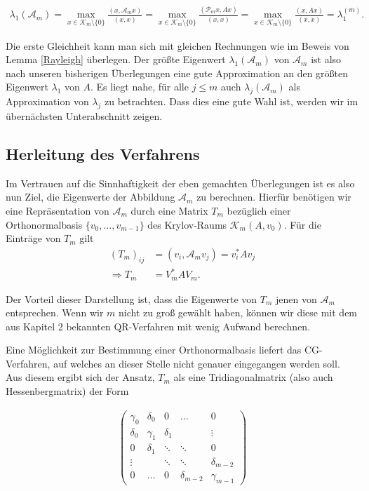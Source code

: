 \documentclass{article}
\begin{document}
\begin{align*}
	\lambda_1(\mathcal{A}_m) = \max_{x \in \mathcal{K}_m \setminus \{0\}} \frac{(x, \mathcal{A}_m x)}{(x,x)} = \max_{x \in \mathcal{K}_m \setminus \{0\}} \frac{(\mathcal{P}_m x, A x)}{(x,x)} = \max_{x \in \mathcal{K}_m \setminus \{0\}} \frac{(x, A x)}{(x,x)} = \lambda_1^{(m)}.
\end{align*}

Die erste Gleichheit kann man sich mit gleichen Rechnungen wie im Beweis von Lemma \ref{Rayleigh} überlegen. Der größte Eigenwert $\lambda_1(\mathcal{A}_m)$ von $\mathcal{A}_m$ ist also nach unseren bisherigen Überlegungen eine gute Approximation an den größten Eigenwert $\lambda_1$ von $A$. Es liegt nahe, für alle $j \leq m$ auch $\lambda_j(\mathcal{A}_m)$ als Approximation von $\lambda_j$ zu betrachten. Dass dies eine gute Wahl ist, werden wir im übernächsten Unterabschnitt zeigen.

\subsection{Herleitung des Verfahrens}

Im Vertrauen auf die Sinnhaftigkeit der eben gemachten Überlegungen ist es also nun Ziel, die Eigenwerte der Abbildung $\mathcal{A}_m$ zu berechnen. Hierfür benötigen wir eine Repräsentation von $\mathcal{A}_m$ durch eine Matrix $T_m$ bezüglich einer Orthonormalbasis $\{v_0, \dots, v_{m-1}\}$ des Krylov-Raums $\mathcal{K}_m(A,v_0)$. Für die Einträge von $T_m$ gilt
\begin{align*}
	(T_m)_{ij} &= (v_i, \mathcal{A}_m v_j) = v_i^*Av_j \\
	\Rightarrow T_m &= V_m^*AV_m.
\end{align*}

Der Vorteil dieser Darstellung ist, dass die Eigenwerte von $T_m$ jenen von $\mathcal{A}_m$ entsprechen. Wenn wir $m$ nicht zu groß gewählt haben, können wir diese mit dem aus Kapitel 2 bekannten QR-Verfahren mit wenig Aufwand berechnen.

Eine Möglichkeit zur Bestimmung einer Orthonormalbasis liefert das CG-Verfahren, auf welches an dieser Stelle nicht genauer eingegangen werden soll. Aus diesem ergibt sich der Ansatz, $T_m$ als eine Tridiagonalmatrix (also auch Hessenbergmatrix) der Form

\begin{align}\label{trimatrix}
\begin{pmatrix}
	\gamma_0 & \delta_0 & 0 & \hdots & 0 \\
	\delta_0 & \gamma_1 & \delta_1 &  & \vdots \\
	0 & \delta_1 & \ddots & \ddots & 0 \\
	\vdots &  & \ddots & \ddots & \delta_{m-2} \\
	0 & \hdots & 0 & \delta_{m-2} & \gamma_{m-1}
\end{pmatrix}
\end{align}
\end{document}
